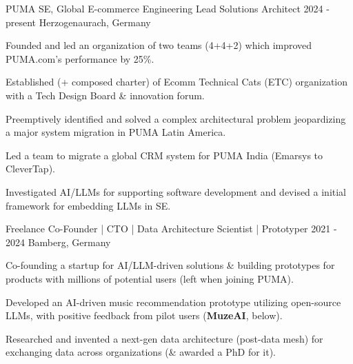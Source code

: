 {}


\begin{cventries}






    
        
  \cventry
    {PUMA SE, Global E-commerce Engineering}  %
    {Lead Solutions Architect} %
    {2024 - present} %
    {Herzogenaurach, Germany} %
    {
      \begin{cvitems} %
		\item {Founded and led an organization of two teams (4+4+2) which improved PUMA.com's performance by 25\%.}
		\item {Established (+ composed charter) of Ecomm Technical Cats (ETC) organization with a Tech Design Board \& innovation forum.}
		\item {Preemptively identified and solved a complex architectural problem jeopardizing a major system migration in PUMA Latin America.}
		\item {Led a team to migrate a global CRM system for PUMA India (Emarsys to CleverTap).}
		\item {Investigated AI/LLMs for supporting software development and devised a initial framework for embedding LLMs in SE.}						
    \end{cvitems}
    }
    



    
        
  \cventry
    {Freelance}   %
    {Co-Founder | CTO  | Data Architecture Scientist | Prototyper} %
    {2021 - 2024} %
    {Bamberg, Germany} %
    {
      \begin{cvitems} %
		\item {Co-founding a startup for AI/LLM-driven solutions \& building prototypes for products with millions of potential users (left when joining PUMA).}
		\item {Developed an AI-driven music recommendation prototype utilizing open-source LLMs, with positive feedback from pilot users (\textbf{MuzeAI}, below).}
		\item {Researched and invented a next-gen data architecture (post-data mesh) for exchanging data across organizations (\& awarded a PhD for it).}
    \end{cvitems}
    }
    



\end{cventries}

